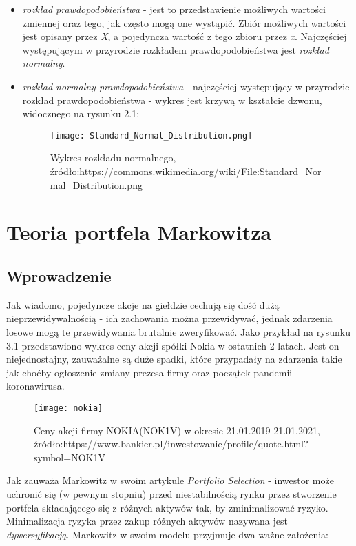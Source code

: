 \documentclass[magister]{dyplom}
\begin{document}
\begin{itemize}
\item \textit{rozkład prawdopodobieństwa} - jest to przedstawienie możliwych wartości zmiennej oraz tego, jak często mogą one wystąpić. Zbiór możliwych wartości jest opisany przez \textit{X}, a pojedyncza wartość z tego zbioru przez \textit{x}. Najczęściej występującym w przyrodzie rozkładem prawdopodobieństwa jest \textit{rozkład normalny}.\newline
\newpage
\item \textit{rozkład normalny prawdopodobieństwa} - najczęściej występujący w przyrodzie rozkład prawdopodobieństwa - wykres jest krzywą w kształcie dzwonu, widocznego na rysunku 2.1:
\begin{figure}[h]
	\centering
	\texttt{[image: Standard\_Normal\_Distribution.png]}
	\caption{Wykres rozkładu normalnego,\newline
		źródło:https://commons.wikimedia.org/wiki/File:Standard\_Normal\_Distribution.png}
\end{figure}
\end{itemize}
\chapter{Teoria portfela Markowitza}

\section{Wprowadzenie}

Jak wiadomo, pojedyncze akcje na giełdzie cechują się dość dużą nieprzewidywalnością - ich zachowania można przewidywać, jednak zdarzenia losowe mogą te przewidywania brutalnie zweryfikować. Jako przykład na rysunku 3.1 przedstawiono wykres ceny akcji spółki Nokia w ostatnich 2 latach. Jest on niejednostajny, zauważalne są duże spadki, które przypadały na zdarzenia takie jak choćby ogłoszenie zmiany prezesa firmy oraz początek pandemii koronawirusa. 

\begin{figure}[h]
\texttt{[image: nokia]}
\caption{Ceny akcji firmy NOKIA(NOK1V) w okresie 21.01.2019-21.01.2021,\newline
	źródło:https://www.bankier.pl/inwestowanie/profile/quote.html?symbol=NOK1V}
\end{figure}

Jak zauważa Markowitz w swoim artykule \textit{Portfolio Selection} - inwestor może uchronić się (w pewnym stopniu) przed niestabilnością rynku przez stworzenie portfela składającego się z różnych aktywów tak, by zminimalizować ryzyko\cite{markowitz}. Minimalizacja ryzyka przez zakup różnych aktywów nazywana jest \textit{dywersyfikacją}. Markowitz w swoim modelu przyjmuje dwa ważne założenia: 
\end{document}

